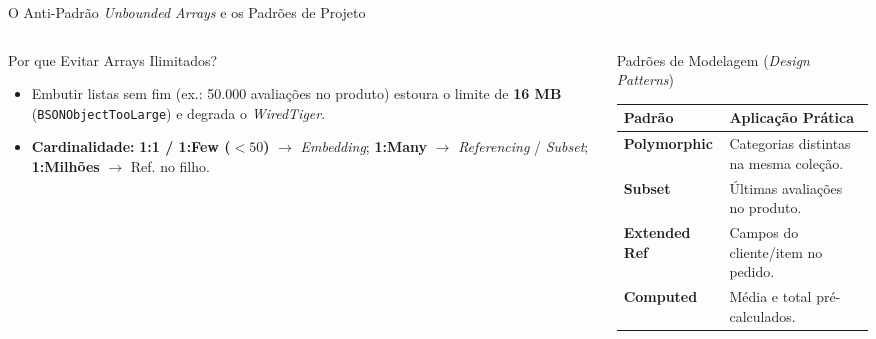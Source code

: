 \begin{frame}{O Anti-Padrão \textit{Unbounded Arrays} e os Padrões de Projeto}
  \vspace{0.05cm}
  \begin{columns}[t]
    \begin{column}{0.46\textwidth}
      \alert{Por que Evitar Arrays Ilimitados?}\par
      \scriptsize
      \begin{itemize}
        \item Embutir listas sem fim (ex.: 50.000 avaliações no produto) estoura o limite de \textbf{16 MB} (\texttt{BSONObjectTooLarge}) e degrada o \textit{WiredTiger}.
        \item \textbf{Cardinalidade:} \textbf{1:1 / 1:Few ($<50$)} $\to$ \textit{Embedding}; \textbf{1:Many} $\to$ \textit{Referencing} / \textit{Subset}; \textbf{1:Milhões} $\to$ Ref. no filho.
      \end{itemize}
    \end{column}
    \begin{column}{0.50\textwidth}
      \alert{Padrões de Modelagem (\textit{Design Patterns})}\par
      \vspace{0.03cm}
      \scriptsize
      \renewcommand{\arraystretch}{1.08}
      \begin{tabular}{p{1.65cm} p{2.65cm}}
        \toprule
        \textbf{Padrão} & \textbf{Aplicação Prática} \\
        \midrule
        \textbf{Polymorphic} & Categorias distintas na mesma coleção. \\
        \textbf{Subset} & Últimas avaliações no produto. \\
        \textbf{Extended Ref} & Campos do cliente/item no pedido. \\
        \textbf{Computed} & Média e total pré-calculados. \\
        \bottomrule
      \end{tabular}
    \end{column}
  \end{columns}
\end{frame}
